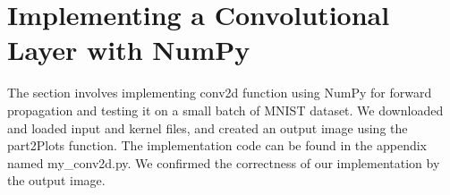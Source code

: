 \documentclass[3p,times,procedia]{elsarticle}
\begin{document}


\section{\textbf{Implementing a Convolutional Layer with NumPy}}

The section involves implementing conv2d function using NumPy for forward propagation and testing it on a small batch of MNIST dataset.
We downloaded and loaded input and kernel files, and created an output image using the part2Plots function.
The implementation code can be found in the appendix named my\_conv2d.py.
We confirmed the correctness of our implementation by the output image.



\end{document}
